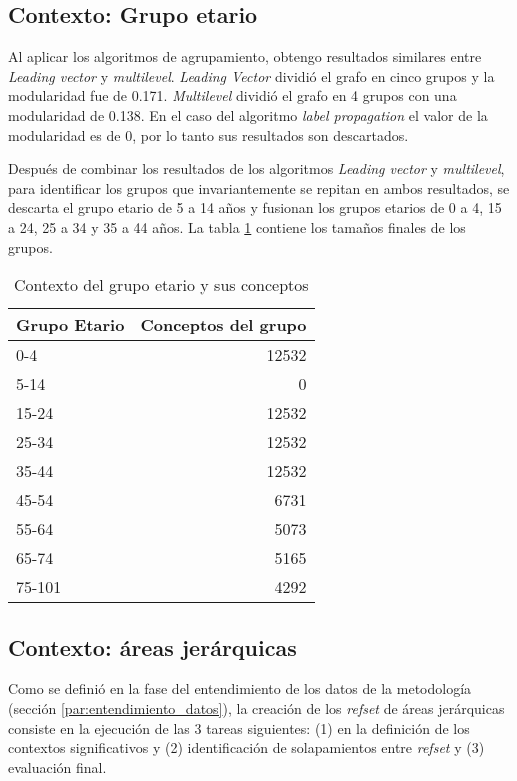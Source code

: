 \subsection{Contexto: Grupo etario}
\label{par:contexto-grupo-etario}
Al aplicar los algoritmos de agrupamiento, obtengo resultados similares entre \textit{Leading vector} y \textit{multilevel}. \textit{Leading Vector} dividió el grafo en cinco grupos y la modularidad  fue de \num{0.171}. \textit{Multilevel} dividió el grafo en 4 grupos con una modularidad de \num{0.138}. En el caso del algoritmo \textit{label propagation} el valor de la modularidad es de 0, por lo tanto sus resultados son descartados.

Después de combinar los resultados de los algoritmos \textit{Leading vector} y \textit{multilevel}, para identificar los grupos que invariantemente se repitan en ambos resultados, se descarta el grupo etario de 5 a 14 años y fusionan los grupos etarios de 0 a 4, 15 a 24, 25 a 34 y 35 a 44 años. La tabla \ref{grupo_etario_clus} contiene los tamaños finales de los grupos.


\begin{table}[htb]
\centering
\caption{Contexto del grupo etario  y sus conceptos}
\label{grupo_etario_clus}
\begin{tabular}{@{}lr@{}}
\toprule
Grupo Etario & Conceptos del grupo \\ \midrule
0-4  & \num{12532} \\
5-14 & \num{0} \\
15-24  & \num{12532} \\
25-34  & \num{12532} \\
35-44 & \num{12532} \\
45-54  & \num{6731} \\
55-64  & \num{5073} \\
65-74  & \num{5165} \\
75-101 & \num{4292} \\ \bottomrule
\end{tabular}
\end{table}

\subsection{Contexto: áreas jerárquicas}
\label{par:contexto-areas}
Como se definió en la fase del entendimiento de los datos de la metodología (sección \ref{par:entendimiento_datos}), la creación de los \textit{\acrshort{refset}} de áreas jerárquicas consiste en la ejecución de las 3 tareas siguientes: (1) en la definición de los contextos significativos y (2) identificación de solapamientos entre \textit{\acrshort{refset}} y (3) evaluación final. 

